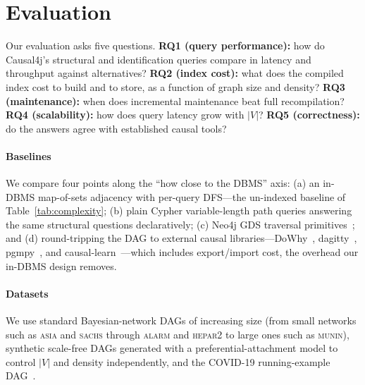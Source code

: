 \section{Evaluation}\label{sec:eval}


Our evaluation asks five questions. \textbf{RQ1 (query performance):} how do
Causal4j's structural and identification queries compare in latency and
throughput against alternatives? \textbf{RQ2 (index cost):} what does the
compiled index cost to build and to store, as a function of graph size and
density? \textbf{RQ3 (maintenance):} when does incremental maintenance beat full
recompilation? \textbf{RQ4 (scalability):} how does query latency grow with
$|V|$? \textbf{RQ5 (correctness):} do the answers agree with established causal
tools?

\paragraph{Baselines}
We compare four points along the ``how close to the DBMS'' axis: (a) an in-DBMS
map-of-sets adjacency with per-query DFS---the un-indexed baseline of
Table~\ref{tab:complexity}; (b) plain Cypher variable-length path queries
answering the same structural questions declaratively; (c) Neo4j GDS traversal
primitives~\cite{TODO_neo4j}; and (d) round-tripping the DAG to external causal
libraries---DoWhy~\cite{TODO_dowhy}, dagitty~\cite{TODO_dagitty},
pgmpy~\cite{TODO_pgmpy}, and causal-learn~\cite{TODO_causallearn}---which
includes export/import cost, the overhead our in-DBMS design removes.

\paragraph{Datasets}
We use standard Bayesian-network DAGs of increasing size (from small networks such
as \textsc{asia} and \textsc{sachs} through \textsc{alarm} and \textsc{hepar2} to
large ones such as \textsc{munin}), synthetic scale-free DAGs generated with a
preferential-attachment model to control $|V|$ and density independently, and the
COVID-19 running-example DAG~\cite{piccininni2020covid}. 

